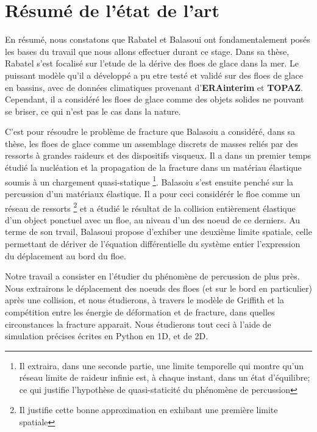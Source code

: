 
\section{Résumé de l'état de l'art}

En résumé, nous constatons que Rabatel et Balasoui ont fondamentalement posés les bases du travail que nous allons effectuer durant ce stage. Dans sa thèse, Rabatel s'est focalisé sur l'etude de la dérive des floes de glace dans la mer. Le puissant modèle qu'il a développé a pu etre testé et validé sur des floes de glace en bassins, avec de données climatiques provenant d'\textbf{ERAinterim} et \textbf{TOPAZ}. Cependant, il a considéré les floes de glace comme des objets solides ne pouvant se briser, ce qui n'est pas le cas dans la nature. 

C'est pour résoudre le problème de fracture que Balasoiu a considéré, dans sa thèse, les floes de glace comme un assemblage discrets de masses reliés par des ressorts à grandes raideurs et des dispositifs visqueux. Il a dans un premier temps étudié la nucléation et la propagation de la fracture dans un matériau élastique soumis à un chargement quasi-statique \footnote{Il extraira, dans une seconde partie, une limite temporelle qui montre qu'un réseau limite de raideur infinie est, à chaque instant, dans un état d’équilibre; ce qui justifie l’hypothèse de quasi-staticité du phénomène de percussion}. Balasoiu s'est ensuite penché sur la percussion d'un matériaux élastique. Il a pour ceci considérér le floe comme un réseau de ressorts \footnote{Il justifie cette bonne approximation en exhibant une première limite spatiale} et a étudié le résultat de la collision entièrement élastique d'un object ponctuel avec un floe, au niveau d'un des noeud de ce derniers. Au terme de son trvail, Balasoui propose d'exhiber une deuxième limite spatiale, celle permettant de dériver de l’équation différentielle du système entier l’expression du déplacement au bord du floe. 

Notre travail a consister en l'étudier du phénomène de percussion de plus près. Nous extrairons le déplacement des noeuds des floes (et sur le bord en particulier) après une collision, et nous étudierons, à travers le modèle de Griffith et la compétition entre les énergie de déformation et de fracture, dans quelles circonstances la fracture apparait. Nous étudierons tout ceci à l'aide de simulation précises écrites en Python en 1D, et de 2D. 



